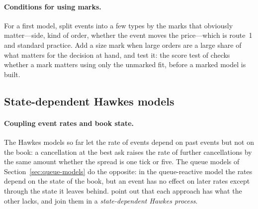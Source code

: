 \paragraph{Conditions for using marks.} For a first model, split events into a few types by the marks that obviously
matter---side, kind of order, whether the event moves the price---which is route~1 and standard practice. Add a
size mark when large orders are a large share of what matters for the decision at hand, and test it: the score
test of \citet{richards2025scoretest} checks whether a mark matters using only the unmarked fit, before a marked
model is built.

\subsection{State-dependent Hawkes models}
\label{sec:hawkes-sd}

\paragraph{Coupling event rates and book state.} The Hawkes models so far let the rate of events depend on past events
but not on the book: a cancellation at the best ask raises the rate of further cancellations by the same amount
whether the spread is one tick or five. The queue models of Section~\ref{sec:queue-models} do the opposite: in
the queue-reactive model the rates depend on the state of the book, but an event has no effect on later rates
except through the state it leaves behind. \citet{morariupatrichi2022} point out that each approach has what the
other lacks, and join them in a \emph{state-dependent Hawkes process}.

